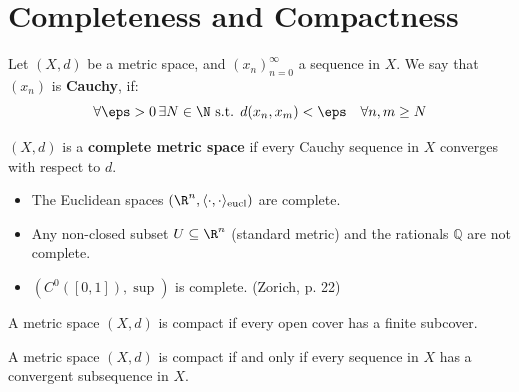 \hrulefill

\section{Completeness and Compactness}

\begin{definition*}
Let $(X, d)$ be a metric space, and $(x_n)_{n=0}^\infty$ a sequence in $X$. We say that $(x_n)$ is \textcolor{eDarkGreen}{\textbf{Cauchy}}, if:
\[ \forall \eps > 0 \, \exists N \in \N \text{ s.t. } d(x_n, x_m) < \eps \quad \forall n, m \ge N \]

$(X, d)$ is a \textcolor{eDarkGreen}{\textbf{complete metric space}} if every Cauchy sequence in $X$ converges with respect to $d$.
\end{definition*}

\begin{example*}
\begin{itemize}
    \item The Euclidean spaces $(\R^n, \langle \cdot, \cdot \rangle_{\text{eucl}})$ are complete.
    \item Any non-closed subset $U \subseteq \R^n$ (standard metric) and the rationals $\mathbb{Q}$ are not complete.
    \item $(C^0([0,1]), \sup)$ is complete. \textcolor{eGray}{(Zorich, p. 22)}
\end{itemize}
\end{example*}

\begin{definition*}[Compactness]
A metric space $(X, d)$ is compact if every open cover has a finite subcover.
\end{definition*}

\begin{theorem*}
A metric space $(X, d)$ is compact if and only if every sequence in $X$ has a convergent subsequence in $X$.
\end{theorem*}

